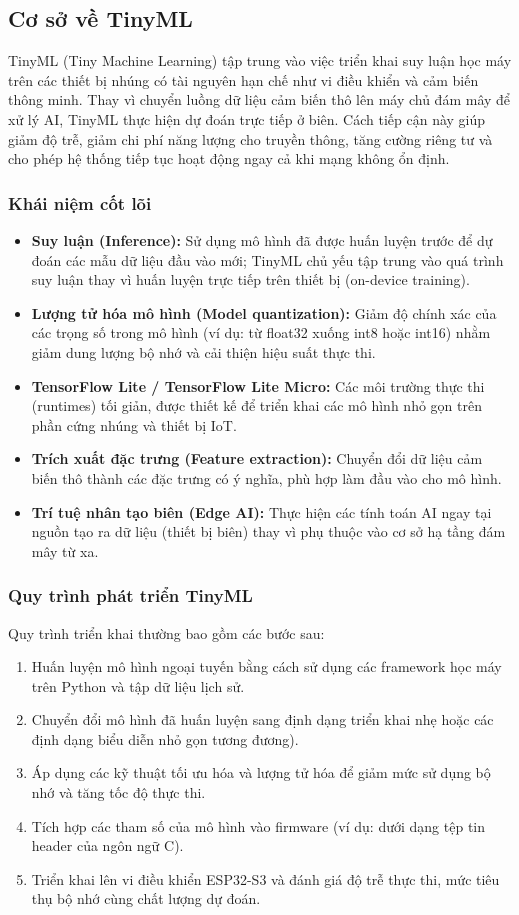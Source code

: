 \subsection{Cơ sở về TinyML}
TinyML (Tiny Machine Learning) tập trung vào việc triển khai suy luận học máy trên các thiết bị nhúng có tài nguyên hạn chế như vi điều khiển và cảm biến thông minh. Thay vì chuyển luồng dữ liệu cảm biến thô lên máy chủ đám mây để xử lý AI, TinyML thực hiện dự đoán trực tiếp ở biên. Cách tiếp cận này giúp giảm độ trễ, giảm chi phí năng lượng cho truyền thông, tăng cường riêng tư và cho phép hệ thống tiếp tục hoạt động ngay cả khi mạng không ổn định.

\subsubsection{Khái niệm cốt lõi}
\begin{itemize}
    \item \textbf{Suy luận (Inference):} Sử dụng mô hình đã được huấn luyện trước để dự đoán các mẫu dữ liệu đầu vào mới; TinyML chủ yếu tập trung vào quá trình suy luận thay vì huấn luyện trực tiếp trên thiết bị (on-device training).
    \item \textbf{Lượng tử hóa mô hình (Model quantization):} Giảm độ chính xác của các trọng số trong mô hình (ví dụ: từ float32 xuống int8 hoặc int16) nhằm giảm dung lượng bộ nhớ và cải thiện hiệu suất thực thi.
    \item \textbf{TensorFlow Lite / TensorFlow Lite Micro:} Các môi trường thực thi (runtimes) tối giản, được thiết kế để triển khai các mô hình nhỏ gọn trên phần cứng nhúng và thiết bị IoT.
    \item \textbf{Trích xuất đặc trưng (Feature extraction):} Chuyển đổi dữ liệu cảm biến thô thành các đặc trưng có ý nghĩa, phù hợp làm đầu vào cho mô hình.
    \item \textbf{Trí tuệ nhân tạo biên (Edge AI):} Thực hiện các tính toán AI ngay tại nguồn tạo ra dữ liệu (thiết bị biên) thay vì phụ thuộc vào cơ sở hạ tầng đám mây từ xa.
\end{itemize}

\subsubsection{Quy trình phát triển TinyML}
Quy trình triển khai thường bao gồm các bước sau:
\begin{enumerate}
    \item Huấn luyện mô hình ngoại tuyến bằng cách sử dụng các framework học máy trên Python và tập dữ liệu lịch sử.
    \item Chuyển đổi mô hình đã huấn luyện sang định dạng triển khai nhẹ  hoặc các định dạng biểu diễn nhỏ gọn tương đương).
    \item Áp dụng các kỹ thuật tối ưu hóa và lượng tử hóa để giảm mức sử dụng bộ nhớ và tăng tốc độ thực thi.
    \item Tích hợp các tham số của mô hình vào firmware (ví dụ: dưới dạng tệp tin header của ngôn ngữ C).
    \item Triển khai lên vi điều khiển ESP32-S3 và đánh giá độ trễ thực thi, mức tiêu thụ bộ nhớ cùng chất lượng dự đoán.
\end{enumerate}

